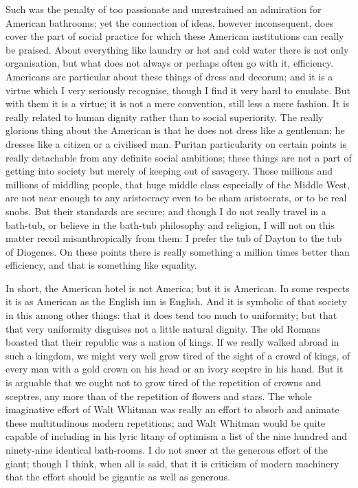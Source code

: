 \documentclass{book}
\begin{document}
Such was the penalty of too passionate and unrestrained an admiration for American bathrooms; yet the connection of ideas, however inconsequent, does cover the part of social practice for which these American institutions can really be praised. About everything like laundry or hot and cold water there is not only organisation, but what does not always or perhaps often go with it, efficiency. Americans are particular about these things of dress and decorum; and it is a virtue which I very seriously recognise, though I find it very hard to emulate. But with them it is a virtue; it is not a mere convention, still less a mere fashion. It is really related to human dignity rather than to social superiority. The really glorious thing about the American is that he does not dress like a gentleman; he dresses like a citizen or a civilised man. Puritan particularity on certain points is really detachable from any definite social ambitions; these things are not a part of getting into society but merely of keeping out of savagery. Those millions and millions of middling people, that huge middle class especially of the Middle West, are not near enough to any aristocracy even to be sham aristocrats, or to be real snobs. But their standards are secure; and though I do not really travel in a bath-tub, or believe in the bath-tub philosophy and religion, I will not on this matter recoil misanthropically from them: I prefer the tub of Dayton to the tub of Diogenes. On these points there is really something a million times better than efficiency, and that is something like equality.

In short, the American hotel is not America; but it is American. In some respects it is as American as the English inn is English. And it is symbolic of that society in this among other things: that it does tend too much to uniformity; but that that very uniformity disguises not a little natural dignity. The old Romans boasted that their republic was a nation of kings. If we really walked abroad in such a kingdom, we might very well grow tired of the sight of a crowd of kings, of every man with a gold crown on his head or an ivory sceptre in his hand. But it is arguable that we ought not to grow tired of the repetition of crowns and sceptres, any more than of the repetition of flowers and stars. The whole imaginative effort of Walt Whitman was really an effort to absorb and animate these multitudinous modern repetitions; and Walt Whitman would be quite capable of including in his lyric litany of optimism a list of the nine hundred and ninety-nine identical bath-rooms. I do not sneer at the generous effort of the giant; though I think, when all is said, that it is criticism of modern machinery that the effort should be gigantic as well as generous.
\end{document}
